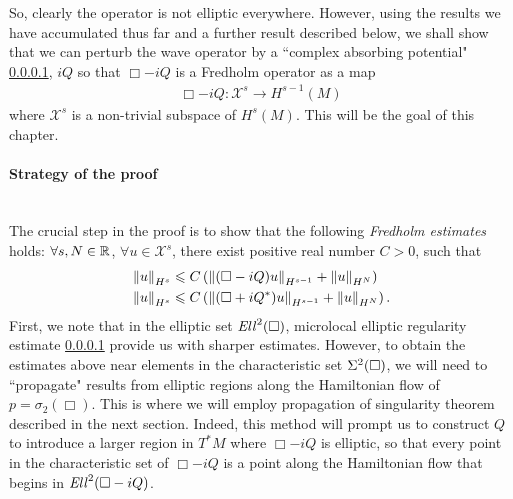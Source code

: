 \documentclass[12pt]{article}
\begin{document}
So, clearly the operator is not elliptic everywhere. However, using the results we have accumulated thus far and a further result described below, we shall show that we can perturb the wave operator by a ``complex absorbing potential" \ref{}, $iQ$ so that $\Box - iQ$ is a Fredholm operator as a map 
\begin{align*}
\Box - iQ : \mathcal{X}^s \to H^{s -1}(M)
\end{align*}
where $\mathcal{X}^s$ is a non-trivial subspace of $H^s(M)$. This will be the goal of this chapter. 



\paragraph{Strategy of the proof} \hfill \\
The crucial step in the proof is to show that the following \textit{Fredholm estimates} holds: $\forall s, N \in \R$, $\forall u \in \mathcal{X}^s$, there exist positive real number $C > 0$, such that
\begin{align*}
&\norm[u]_{H^s} \leq C \brac{ \norm[(\Box - i Q)u]_{H^{s - 1}} + \norm[u]_{H^N}} \\
&\norm[u]_{H^s} \leq C \brac{ \norm[(\Box + i Q^*)u]_{H^{s - 1}} + \norm[u]_{H^N}}. 
\end{align*}
First, we note that in the elliptic set $\Ell^2(\Box)$, microlocal elliptic regularity estimate \ref{} provide us with sharper estimates. However, to obtain the estimates above near elements in the characteristic set $\Char^2(\Box)$, we will need to ``propagate" results from elliptic regions along the Hamiltonian flow of $p = \sigma_2(\Box)$. This is where we will employ propagation of singularity theorem described in the next section. Indeed, this method will prompt us to construct $Q$ to introduce a larger region in $T^*M$ where $\Box - iQ$ is elliptic, so that every point in the characteristic set of $\Box - iQ$ is a point along the Hamiltonian flow that begins in $\Ell^2(\Box - iQ)$. 
\end{document}
